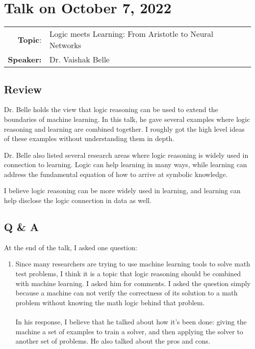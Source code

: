 \documentclass[11pt, oneside]{article}   	%
\begin{document}
\newpage
\section{Talk on October 7, 2022}

\begin{tabularx} {\textwidth}{r X}
\textbf{Topic}: & Logic meets Learning: From Aristotle to Neural Networks\\
\textbf{Speaker:} & Dr. Vaishak Belle\\
\end{tabularx}

\subsection{Review}
Dr. Belle holds the view that logic reasoning can be used to extend the boundaries of machine learning. In this talk, he gave several examples where logic reasoning and learning are combined together. I roughly got the high level ideas of these examples without understanding them in depth. 

Dr. Belle also listed several research areas where logic reasoning is widely used in connection to learning. Logic can help learning in many ways, while learning can address the fundamental equation of how to arrive at symbolic knowledge. 

I believe logic reasoning can be more widely used in learning, and learning can help disclose the logic connection in data as well.


\subsection{Q \& A}
At the end of the talk, I asked one question:
\begin{enumerate}
  
\item Since many researchers are trying to use machine learning tools to solve math test problems, I think it is a topic that logic reasoning should be combined with machine learning. I asked him for comments. I asked the question simply because a machine can not verify the correctness of its solution to a math problem without knowing the math logic behind that problem.\\ \\
In his response, I believe that he talked about how it's been done: giving the machine a set of examples to train a solver, and then applying the solver to another set of problems. He also talked about the pros and cons.\\


\end{enumerate}
\end{document}
